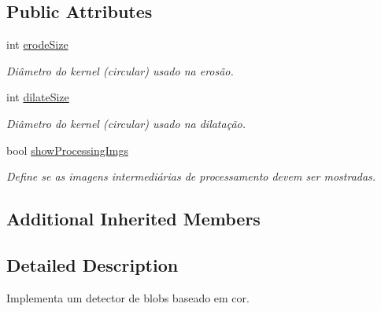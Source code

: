 \subsection*{Public Attributes}
\begin{DoxyCompactItemize}
\item 
\hypertarget{class_viscv_1_1_color_blob_detector_h_f_ade892534cd32ce4ae635c5d79c76dbbf}{}int \hyperlink{class_viscv_1_1_color_blob_detector_h_f_ade892534cd32ce4ae635c5d79c76dbbf}{erode\+Size}\label{class_viscv_1_1_color_blob_detector_h_f_ade892534cd32ce4ae635c5d79c76dbbf}

\begin{DoxyCompactList}\small\item\em Diâmetro do kernel (circular) usado na erosão. \end{DoxyCompactList}\item 
\hypertarget{class_viscv_1_1_color_blob_detector_h_f_ad0b5e1ba575b162ef99943983c9ca931}{}int \hyperlink{class_viscv_1_1_color_blob_detector_h_f_ad0b5e1ba575b162ef99943983c9ca931}{dilate\+Size}\label{class_viscv_1_1_color_blob_detector_h_f_ad0b5e1ba575b162ef99943983c9ca931}

\begin{DoxyCompactList}\small\item\em Diâmetro do kernel (circular) usado na dilatação. \end{DoxyCompactList}\item 
\hypertarget{class_viscv_1_1_color_blob_detector_h_f_ad56f3dc42f92c3f920caed1aec8ead03}{}bool \hyperlink{class_viscv_1_1_color_blob_detector_h_f_ad56f3dc42f92c3f920caed1aec8ead03}{show\+Processing\+Imgs}\label{class_viscv_1_1_color_blob_detector_h_f_ad56f3dc42f92c3f920caed1aec8ead03}

\begin{DoxyCompactList}\small\item\em Define se as imagens intermediárias de processamento devem ser mostradas. \end{DoxyCompactList}\end{DoxyCompactItemize}
\subsection*{Additional Inherited Members}


\subsection{Detailed Description}
Implementa um detector de blobs baseado em cor. 

